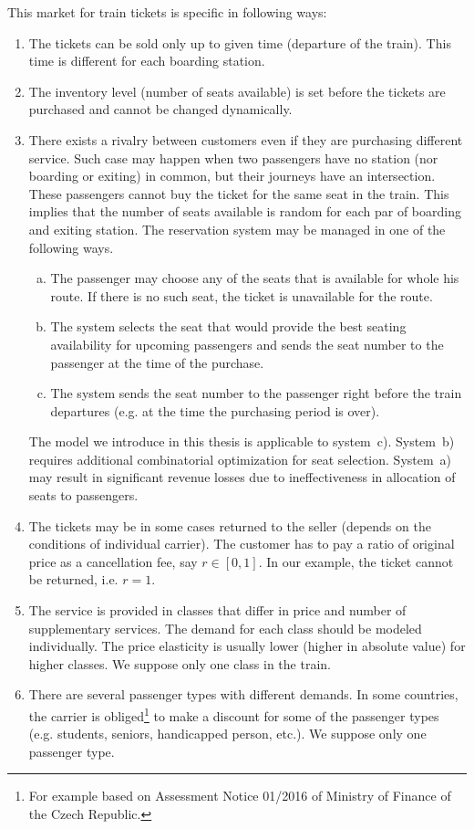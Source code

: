 This market for train tickets is specific in following ways:
\begin{enumerate}[\itshape i)]
	\item The tickets can be sold only up to given time (departure of the train). This time is different for each boarding station.
	\item The inventory level (number of seats available) is set before the tickets are purchased and cannot be changed dynamically.
	\item There exists a rivalry between customers even if they are purchasing different service. Such case may happen when two passengers have no station (nor boarding or exiting) in common, but their journeys have an intersection. These passengers cannot buy the ticket for the same seat in the train. This implies that the number of seats available is random for each par of boarding and exiting station. The reservation system may be managed in one of the following ways.
	\begin{enumerate}[a)]
		\item The passenger may choose any of the seats that is available for whole his route. If there is no such seat, the ticket is unavailable for the route.
		\item The system selects the seat that would provide the best seating availability for upcoming passengers and sends the seat number to the passenger at the time of the purchase.
		\item The system sends the seat number to the passenger right before the train departures (e.g. at the time the purchasing period is over).
	\end{enumerate}
	The model we introduce in this thesis is applicable to system~c). System~b) requires additional combinatorial optimization for seat selection. System~a) may result in significant revenue losses due to ineffectiveness in allocation of seats to passengers.
	\item The tickets may be in some cases returned to the seller (depends on the conditions of individual carrier). The customer has to pay a ratio of original price as a cancellation fee, say $r \in [0,1]$. In our example, the ticket cannot be returned, i.e. $r = 1$.
	\item The service is provided in classes that differ in price and number of supplementary services. The demand for each class should be modeled individually. The price elasticity is usually lower (higher in absolute value) for higher classes. We suppose only one class in the train.
	\item There are several passenger types with different demands. In some countries, the carrier is obliged\footnote{For example based on Assessment Notice 01/2016 of Ministry of Finance of the Czech Republic.} to make a discount for some of the passenger types (e.g. students, seniors, handicapped person, etc.). We suppose only one passenger type.
\end{enumerate}

